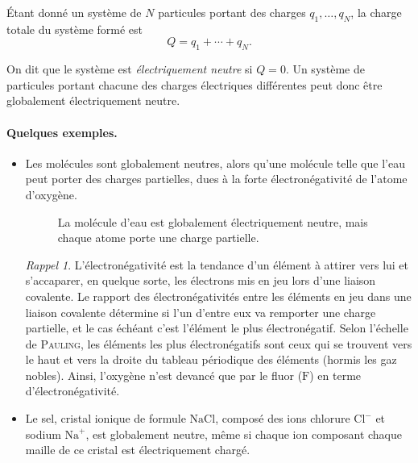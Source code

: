 \documentclass{article}
\theoremstyle{definition}
\theoremstyle{remark}
\newtheorem*{rap}{Rappel}
\begin{document}
Étant donné un système de $N$ particules portant des charges $q_1,\ldots,q_N$, la charge totale du système formé est 
\[Q = q_1+\cdots+q_N.\]

On dit que le système est \textit{électriquement neutre} si $Q=0$. Un système de particules portant chacune des charges électriques différentes peut donc être globalement électriquement neutre.

\paragraph{Quelques exemples.} \begin{itemize}
	\item Les molécules sont globalement neutres, alors qu'une molécule telle que l'eau peut porter des charges partielles, dues à la forte électronégativité de l'atome d'oxygène. 

\begin{figure}[H]	
	\centering
	\caption{La molécule d'eau est globalement électriquement neutre, mais chaque atome porte une charge partielle.}
\end{figure}

\begin{rap}
	L'électronégativité est la tendance d'un élément à attirer vers lui et s'accaparer, en quelque sorte, les électrons mis en jeu lors d'une liaison covalente. Le rapport des électronégativités entre les éléments en jeu dans une liaison covalente détermine si l'un d'entre eux va remporter une charge partielle, et le cas échéant c'est l'élément le plus électronégatif. Selon l'échelle de \textsc{Pauling}, les éléments les plus électronégatifs sont ceux qui se trouvent vers le haut et vers la droite du tableau périodique des éléments (hormis les gaz nobles). Ainsi, l'oxygène n'est devancé que par le fluor ($\mathrm{F}$) en terme d'électronégativité.
\end{rap}

\item Le sel, cristal ionique de formule $\mathrm{NaCl}$, composé des ions chlorure $\mathrm{Cl}^{-}$ et sodium $\mathrm{Na}^+$, est globalement neutre, même si chaque ion composant chaque maille de ce cristal est électriquement chargé.


\end{itemize}
\end{document}
